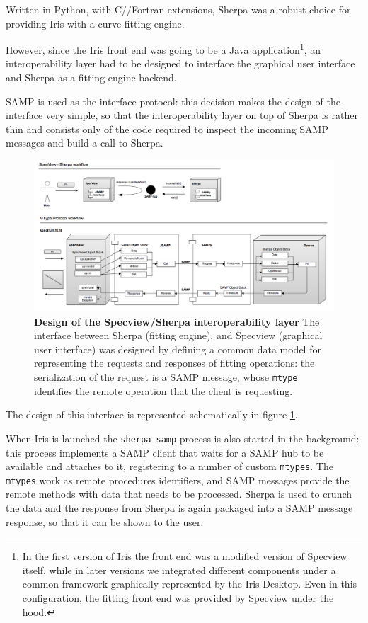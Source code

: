 \documentclass[final,5p]{elsarticle}
\begin{document}
Written in Python, with C/\Cpp/Fortran extensions, Sherpa was a robust choice for providing Iris with a curve fitting engine.

However, since the Iris front end was going to be a Java application\footnote{In the first version of Iris the front end was a modified version of Specview itself, while in later versions we integrated different components under a common framework graphically represented by the Iris Desktop. Even in this configuration, the fitting front end was provided by Specview under the hood.}, an interoperability layer had to be designed to interface the graphical user interface and Sherpa as a fitting engine backend.

SAMP is used as the interface protocol: this decision makes the design of the interface very simple, so that the interoperability layer on top of Sherpa is rather thin and consists only of the code required to inspect the incoming SAMP messages and build a call to Sherpa.

\begin{figure}
\label{fig:sherpasamp}
\begin{center}
\includegraphics[width=\textwidth]{figures/sherpasamp.png}
\caption{\textbf{Design of the Specview/Sherpa interoperability layer} The interface between Sherpa (fitting engine), and Specview (graphical user interface) was designed by defining a common data model for representing the requests and responses of fitting operations: the serialization of the request is a SAMP message, whose \texttt{mtype} identifies the remote operation that the client is requesting.}
\end{center}
\end{figure}

The design of this interface is represented schematically in figure \ref{fig:sherpasamp}.

When Iris is launched the \verb|sherpa-samp| process is also started in the background: this process implements a SAMP client that waits for a SAMP hub to be available and attaches to it, registering to a number of custom \verb|mtypes|. The \verb|mtypes| work as remote procedures identifiers, and SAMP messages provide the remote methods with data that needs to be processed. Sherpa is used to crunch the data and the response from Sherpa is again packaged into a SAMP message response, so that it can be shown to the user.
\end{document}
